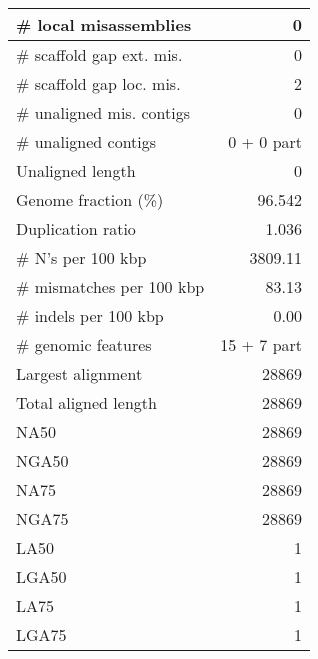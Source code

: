 \documentclass[12pt,a4paper]{article}
\begin{document}
\begin{table}[ht]
\begin{center}
\begin{tabular}{|l*{1}{|r}|}
\# local misassemblies & 0 \\ \hline
\# scaffold gap ext. mis. & 0 \\ \hline
\# scaffold gap loc. mis. & 2 \\ \hline
\# unaligned mis. contigs & 0 \\ \hline
\# unaligned contigs & 0 + 0 part \\ \hline
Unaligned length & 0 \\ \hline
Genome fraction (\%) & 96.542 \\ \hline
Duplication ratio & 1.036 \\ \hline
\# N's per 100 kbp & 3809.11 \\ \hline
\# mismatches per 100 kbp & 83.13 \\ \hline
\# indels per 100 kbp & 0.00 \\ \hline
\# genomic features & 15 + 7 part \\ \hline
Largest alignment & 28869 \\ \hline
Total aligned length & 28869 \\ \hline
NA50 & 28869 \\ \hline
NGA50 & 28869 \\ \hline
NA75 & 28869 \\ \hline
NGA75 & 28869 \\ \hline
LA50 & 1 \\ \hline
LGA50 & 1 \\ \hline
LA75 & 1 \\ \hline
LGA75 & 1 \\ \hline
\end{tabular}
\end{center}
\end{table}
\end{document}
